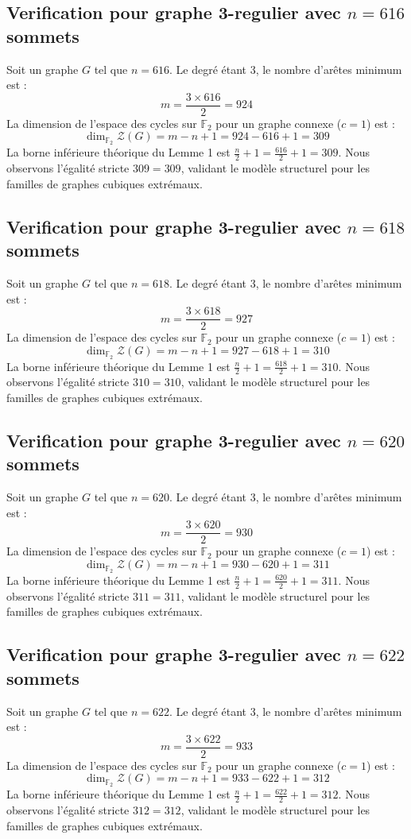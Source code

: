 \documentclass[11pt,a4paper]{article}
\begin{document}
\subsection{Verification pour graphe 3-regulier avec $n=616$ sommets}
Soit un graphe $G$ tel que $n = 616$. Le degré étant 3, le nombre d'arêtes minimum est :
$$ m = \frac{3 \times 616}{2} = 924 $$
La dimension de l'espace des cycles sur $\mathbb{F}_2$ pour un graphe connexe ($c=1$) est :
$$ \dim_{\mathbb{F}_2} \mathcal{Z}(G) = m - n + 1 = 924 - 616 + 1 = 309 $$
La borne inférieure théorique du Lemme 1 est $\frac{n}{2} + 1 = \frac{616}{2} + 1 = 309$.
Nous observons l'égalité stricte $309 = 309$, validant le modèle structurel pour les familles de graphes cubiques extrémaux.

\subsection{Verification pour graphe 3-regulier avec $n=618$ sommets}
Soit un graphe $G$ tel que $n = 618$. Le degré étant 3, le nombre d'arêtes minimum est :
$$ m = \frac{3 \times 618}{2} = 927 $$
La dimension de l'espace des cycles sur $\mathbb{F}_2$ pour un graphe connexe ($c=1$) est :
$$ \dim_{\mathbb{F}_2} \mathcal{Z}(G) = m - n + 1 = 927 - 618 + 1 = 310 $$
La borne inférieure théorique du Lemme 1 est $\frac{n}{2} + 1 = \frac{618}{2} + 1 = 310$.
Nous observons l'égalité stricte $310 = 310$, validant le modèle structurel pour les familles de graphes cubiques extrémaux.

\subsection{Verification pour graphe 3-regulier avec $n=620$ sommets}
Soit un graphe $G$ tel que $n = 620$. Le degré étant 3, le nombre d'arêtes minimum est :
$$ m = \frac{3 \times 620}{2} = 930 $$
La dimension de l'espace des cycles sur $\mathbb{F}_2$ pour un graphe connexe ($c=1$) est :
$$ \dim_{\mathbb{F}_2} \mathcal{Z}(G) = m - n + 1 = 930 - 620 + 1 = 311 $$
La borne inférieure théorique du Lemme 1 est $\frac{n}{2} + 1 = \frac{620}{2} + 1 = 311$.
Nous observons l'égalité stricte $311 = 311$, validant le modèle structurel pour les familles de graphes cubiques extrémaux.

\subsection{Verification pour graphe 3-regulier avec $n=622$ sommets}
Soit un graphe $G$ tel que $n = 622$. Le degré étant 3, le nombre d'arêtes minimum est :
$$ m = \frac{3 \times 622}{2} = 933 $$
La dimension de l'espace des cycles sur $\mathbb{F}_2$ pour un graphe connexe ($c=1$) est :
$$ \dim_{\mathbb{F}_2} \mathcal{Z}(G) = m - n + 1 = 933 - 622 + 1 = 312 $$
La borne inférieure théorique du Lemme 1 est $\frac{n}{2} + 1 = \frac{622}{2} + 1 = 312$.
Nous observons l'égalité stricte $312 = 312$, validant le modèle structurel pour les familles de graphes cubiques extrémaux.
\end{document}
